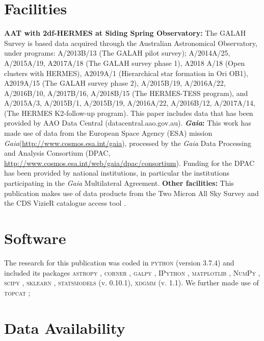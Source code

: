 \documentclass[fleqn,usenatbib]{mnras}
\newcommand{\Gaia}{\textit{Gaia}\xspace} %
\begin{document}
\section*{Facilities}

\textbf{AAT with 2df-HERMES at Siding Spring Observatory:}
The GALAH Survey is based data acquired through the Australian Astronomical Observatory, under programs: A/2013B/13 (The GALAH pilot survey); A/2014A/25, A/2015A/19, A2017A/18 (The GALAH survey phase 1), A2018 A/18 (Open clusters with HERMES), A2019A/1 (Hierarchical star formation in Ori OB1), A2019A/15 (The GALAH survey phase 2), A/2015B/19, A/2016A/22, A/2016B/10, A/2017B/16, A/2018B/15 (The HERMES-TESS program), and A/2015A/3, A/2015B/1, A/2015B/19, A/2016A/22, A/2016B/12, A/2017A/14, (The HERMES K2-follow-up program). This paper includes data that has been provided by AAO Data Central (datacentral.aao.gov.au).
\textbf{\Gaia: } This work has made use of data from the European Space Agency (ESA) mission \Gaia (\url{http://www.cosmos.esa.int/gaia}), processed by the \Gaia Data Processing and Analysis Consortium (DPAC, \url{http://www.cosmos.esa.int/web/gaia/dpac/consortium}). Funding for the DPAC has been provided by national institutions, in particular the institutions participating in the \Gaia Multilateral Agreement. 
\textbf{Other facilities:} This publication makes use of data products from the Two Micron All Sky Survey \citep{Skrutskie2006} and the CDS VizieR catalogue access tool \citep{Vizier2000}.

\section*{Software}

The research for this publication was coded in \textsc{python} (version 3.7.4) and included its packages
\textsc{astropy} \citep[v. 3.2.2;][]{Robitaille2013,PriceWhelan2018},
\textsc{corner} \citep[v. 2.0.1;][]{corner},
\textsc{galpy} \citep[version 1.6.0;][]{Bovy2015},
\textsc{IPython} \citep[v. 7.8.0;][]{ipython},
\textsc{matplotlib} \citep[v. 3.1.3;][]{matplotlib},
\textsc{NumPy} \citep[v. 1.17.2;][]{numpy},
\textsc{scipy} \citep[version 1.3.1;][]{scipy},
\textsc{sklearn} \citep[v. 0.21.3;][]{scikit-learn},
\textsc{statsmodels} (v. 0.10.1),
\textsc{xdgmm} (v. 1.1).
We further made use of \textsc{topcat} \citep[version 4.7;][]{Taylor2005};

\section*{Data Availability}
\end{document}
